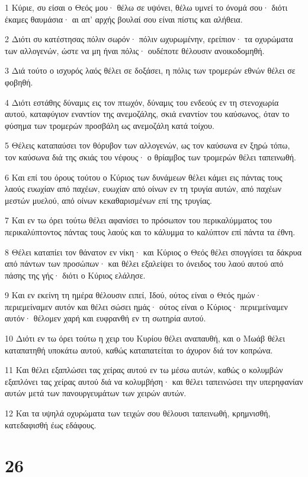 \par 1 Κύριε, συ είσαι ο Θεός μου· θέλω σε υψόνει, θέλω υμνεί το όνομά σου· διότι έκαμες θαυμάσια· αι απ' αρχής βουλαί σου είναι πίστις και αλήθεια.
\par 2 Διότι συ κατέστησας πόλιν σωρόν· πόλιν ωχυρωμένην, ερείπιον· τα οχυρώματα των αλλογενών, ώστε να μη ήναι πόλις· ουδέποτε θέλουσιν ανοικοδομηθή.
\par 3 Διά τούτο ο ισχυρός λαός θέλει σε δοξάσει, η πόλις των τρομερών εθνών θέλει σε φοβηθή.
\par 4 Διότι εστάθης δύναμις εις τον πτωχόν, δύναμις του ενδεούς εν τη στενοχωρία αυτού, καταφύγιον εναντίον της ανεμοζάλης, σκιά εναντίον του καύσωνος, όταν το φύσημα των τρομερών προσβάλη ως ανεμοζάλη κατά τοίχου.
\par 5 Θέλεις καταπαύσει τον θόρυβον των αλλογενών, ως τον καύσωνα εν ξηρώ τόπω, τον καύσωνα διά της σκιάς του νέφους· ο θρίαμβος των τρομερών θέλει ταπεινωθή.
\par 6 Και επί του όρους τούτου ο Κύριος των δυνάμεων θέλει κάμει εις πάντας τους λαούς ευωχίαν από παχέων, ευωχίαν από οίνων εν τη τρυγία αυτών, από παχέων μεστών μυελού, από οίνων κεκαθαρισμένων επί της τρυγίας.
\par 7 Και εν τω όρει τούτω θέλει αφανίσει το πρόσωπον του περικαλύμματος του περικαλύπτοντος πάντας τους λαούς και το κάλυμμα το καλύπτον επί πάντα τα έθνη.
\par 8 Θέλει καταπίει τον θάνατον εν νίκη· και Κύριος ο Θεός θέλει σπογγίσει τα δάκρυα από πάντων των προσώπων· και θέλει εξαλείψει το όνειδος του λαού αυτού από πάσης της γής· διότι ο Κύριος ελάλησε.
\par 9 Και εν εκείνη τη ημέρα θέλουσιν ειπεί, Ιδού, ούτος είναι ο Θεός ημών· περιεμείναμεν αυτόν και θέλει σώσει ημάς· ούτος είναι ο Κύριος· περιεμείναμεν αυτόν· θέλομεν χαρή και ευφρανθή εν τη σωτηρία αυτού.
\par 10 Διότι εν τω όρει τούτω η χειρ του Κυρίου θέλει αναπαυθή, και ο Μωάβ θέλει καταπατηθή υποκάτω αυτού, καθώς καταπατείται το άχυρον διά τον κοπρώνα.
\par 11 Και θέλει εξαπλώσει τας χείρας αυτού εν τω μέσω αυτών, καθώς ο κολυμβών εξαπλόνει τας χείρας αυτού διά να κολυμβήση· και θέλει ταπεινώσει την υπερηφανίαν αυτών μετά των πανουργευμάτων των χειρών αυτών.
\par 12 Και τα υψηλά οχυρώματα των τειχών σου θέλουσι ταπεινωθή, κρημνισθή, κατεδαφισθή έως εδάφους.

\chapter{26}

